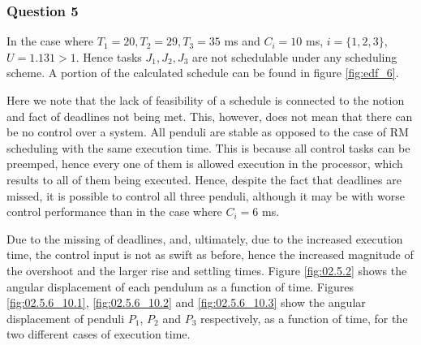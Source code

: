 \subsubsection{Question 5}
In the case where $T_1 = 20, T_2 = 29, T_3 = 35$ ms and $C_i = 10$ ms,
$i=\{1,2,3\}$, $U=1.131 > 1$. Hence tasks $J_1, J_2, J_3$ are not schedulable
under any scheduling scheme. A portion of the calculated schedule can be found
in figure \ref{fig:edf_6}.

Here we note that the lack of feasibility of a schedule is connected to the
notion and fact of deadlines not being met. This, however, does not mean that
there can be no control over a system. All penduli are stable as opposed to the
case of RM scheduling with the same execution time. This is because all control
tasks can be preemped, hence every one of them is allowed execution in the
processor, which results to all of them being executed. Hence, despite the fact
that deadlines are missed, it is possible to control all three penduli, although
it may be with worse control performance than in the case where $C_i = 6$ ms.

Due to the missing of deadlines, and, ultimately, due to the increased execution
time, the control input is not as swift as before, hence the increased magnitude
of the overshoot and the larger rise and settling times. Figure \ref{fig:02.5.2}
shows the angular displacement of each pendulum as a function of time.
Figures \ref{fig:02.5.6_10.1}, \ref{fig:02.5.6_10.2} and \ref{fig:02.5.6_10.3}
show the angular displacement of penduli $P_1$, $P_2$ and $P_3$ respectively, as
a function of time, for the two different cases of execution time.

\noindent{}


